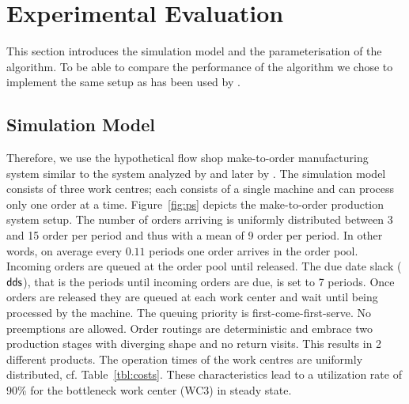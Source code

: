 \documentclass[envcountsame]{llncs}
\begin{document}
\section{Experimental Evaluation}
\label{sec:Experimental_Evaluation}

This section introduces the simulation model and the parameterisation of the algorithm. To be able
to compare the performance of the algorithm we chose to implement the same setup as has been used by
\cite{SchneckenreitherHaeussler2019}.

\subsection{Simulation Model}
\label{subsec:Simulation_Model}

\begin{figure*}[t!]
  \centering
  \caption{Production system of the simulation model with routing, processing time distributions and
    demand.} \label{fig:ps}
\end{figure*}

Therefore, we use the hypothetical flow shop make-to-order manufacturing system similar to the
system analyzed by \cite{Lee1997} and later by \cite{Schneckenreither2019}. The simulation model
consists of three work centres; each consists of a single machine and can process only one order at
a time. Figure~\ref{fig:ps} depicts the make-to-order production system setup.
%
The number of orders arriving is uniformly distributed between 3 and 15 order per period and
thus with a mean of 9 order per period.
%
In other words, on average every $0.11$ periods one order arrives in the order pool.
%
Incoming orders are queued at the order pool until released. The due date slack ($\textsf{dds}$), that is
the periods until incoming orders are due, is set to 7 periods.
%
Once orders are released they are queued at each work center and wait until being processed by the
machine. The queuing priority is first-come-first-serve. No preemptions are allowed. Order
routings are deterministic and embrace two production stages with diverging shape and no return
visits. This results in 2 different products. The operation times of the work centres are
uniformly distributed, cf. Table~\ref{tbl:costs}. These characteristics lead to a utilization rate
of 90\% for the bottleneck work center (WC3) in steady state. %
\end{document}
